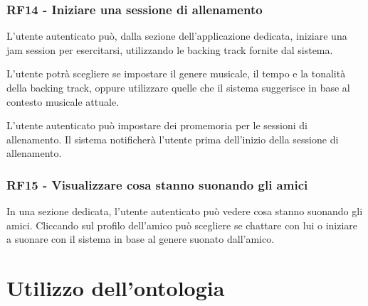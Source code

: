 \documentclass[12pt, a4paper]{article}
\begin{document}
\subsubsection*{\hypertarget{RF14}{RF14 - Iniziare una sessione di allenamento}}

L'utente autenticato può, dalla sezione dell'applicazione dedicata, iniziare una jam session per esercitarsi, utilizzando le backing track fornite dal sistema.

L'utente potrà scegliere se impostare il genere musicale, il tempo e la tonalità della backing track, oppure utilizzare quelle che il sistema suggerisce in base al contesto musicale attuale.


L'utente autenticato può impostare dei promemoria per le sessioni di allenamento. Il sistema notificherà l'utente prima dell'inizio della sessione di allenamento.

\subsubsection*{\hypertarget{RF15}{RF15 - Visualizzare cosa stanno suonando gli amici}}

In una sezione dedicata, l'utente autenticato può vedere cosa stanno suonando gli amici. Cliccando sul profilo dell'amico può scegliere se chattare con lui o iniziare a suonare con il sistema in base al genere suonato dall'amico.
\newpage

\section{Utilizzo dell'ontologia}
\end{document}
